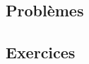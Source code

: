 \documentclass[french]{book}
\newcommand{\N}{\mathbb{N}}
\newcommand{\Z}{\mathbb{Z}}
\newcommand{\U}{\mathbb{U}}
\newcommand{\st}{^*}
\theoremstyle{definition}
\theoremstyle{remark}
\newtheorem*{sol}{Solution}
\begin{document}


\chapter{}

\section{Problèmes}

\section{Exercices}
\end{document}
